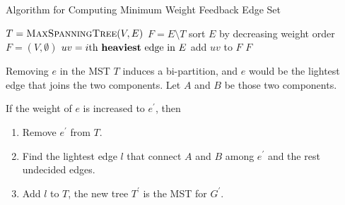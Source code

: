 \begin{homeworkProblem}
\begin{homeworkSubProblem}
\begin{algorithm}[H]
    \caption{Algorithm for Computing Minimum Weight Feedback Edge Set}\label{min_feedback_edge_set}
    \begin{algorithmic}[1]
            \State $T = \textsc{MaxSpanningTree} (V,E)$
            \Return$F = E \setminus T$
        \EndProcedure
            \State{}
            \Return {}
        \EndProcedure
            \State sort $E$ by decreasing weight order
            \State $F = (V, \emptyset)$
            \EndFor
            \State $uv = i\text{th \textbf{heaviest} edge in } E$
                    \State {}
                    \State add $uv$ to $F$
                \EndIf
            \EndFor
            \Return $F$
        \EndProcedure
    \end{algorithmic}
\end{algorithm}
\end{homeworkSubProblem}

\begin{homeworkSubProblem}
Removing $e$ in the MST $T$ induces a bi-partition,
and $e$ would be the lightest edge that
joins the two components.
Let $A$ and $B$ be those two components.

If the weight of $e$ is increased to $e^\prime$, then
\begin{enumerate}[label=\textsc{Step {\arabic*} \ }, leftmargin=2.5cm]
    \item Remove $e^\prime$ from $T$.
    \item Find the lightest edge $l$ that connect
        $A$ and $B$ among
        $e^\prime$ and the rest undecided edges.
    \item Add $l$ to $T$, the new tree $T^\prime$
        is the MST for $G^\prime$.
\end{enumerate}


\end{homeworkSubProblem}
\end{homeworkProblem}
